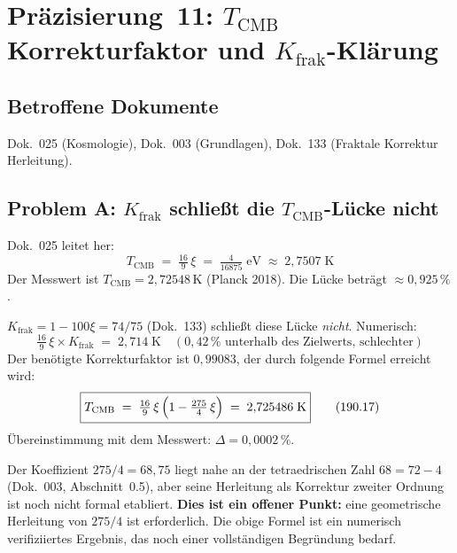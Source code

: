 \section{\texorpdfstring{Präzisierung~11: $T_\text{CMB}$ Korrekturfaktor und $K_\text{frak}$-Klärung}{Präzisierung 11: T\_CMB Korrekturfaktor und K\_frak-Klärung}}

\subsection*{Betroffene Dokumente}

Dok.~025 (Kosmologie), Dok.~003 (Grundlagen), Dok.~133 (Fraktale Korrektur Herleitung).

\subsection*{Problem A: $K_\text{frak}$ schließt die $T_\text{CMB}$-Lücke nicht}

Dok.~025 leitet her:
\begin{equation}
  T_\text{CMB} \;=\; \tfrac{16}{9}\,\xi \;=\; \tfrac{4}{16875}\;\text{eV}
  \;\approx\; 2{,}7507\;\text{K}
  \tag{190.15}
\end{equation}
Der Messwert ist $T_\text{CMB} = 2{,}72548\,\text{K}$ (Planck 2018).
Die Lücke beträgt $\approx 0{,}925\,\%$.

$K_\text{frak} = 1 - 100\xi = 74/75$ (Dok.~133) schließt diese
Lücke \emph{nicht}. Numerisch:
\begin{equation}
  \tfrac{16}{9}\,\xi \times K_\text{frak} \;=\; 2{,}714\;\text{K}
  \quad (0{,}42\,\% \text{ unterhalb des Zielwerts, schlechter})
  \tag{190.16}
\end{equation}
Der benötigte Korrekturfaktor ist $0{,}99083$, der durch folgende
Formel erreicht wird:
\begin{equation}
  \boxed{
    T_\text{CMB} \;=\; \tfrac{16}{9}\,\xi\,\Bigl(1 - \tfrac{275}{4}\,\xi\Bigr)
    \;=\; 2{,}725486\;\text{K}
  }
  \tag{190.17}
\end{equation}
Übereinstimmung mit dem Messwert: $\Delta = 0{,}0002\,\%$.

Der Koeffizient $275/4 = 68{,}75$ liegt nahe an der tetraedrischen Zahl
$68 = 72 - 4$ (Dok.~003, Abschnitt~0.5), aber seine Herleitung als
Korrektur zweiter Ordnung ist noch nicht formal etabliert.
\textbf{Dies ist ein offener Punkt:} eine geometrische Herleitung
von $275/4$ ist erforderlich. Die obige Formel ist ein numerisch
verifiziiertes Ergebnis, das noch einer vollständigen Begründung bedarf.

